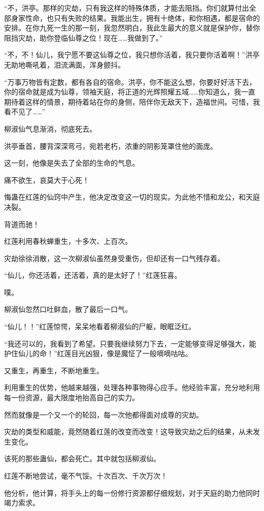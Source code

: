 \begin{this_body}
“不，洪亭。那样的灾劫，只有我这样的特殊体质，才能去阻挡。你们就算付出全部身家性命，也只有失败的结果。我能出生，拥有十绝体，和你相遇，都是宿命的安排。在你九死一生的那一刻，我忽然明白，我此生最大的意义就是保护你，替你阻挡灾劫，助你登临仙尊之位！现在……我做到了。”

“不，不！仙儿，我宁愿不要这仙尊之位，我只想你活着，我只要你活着啊！”洪亭无助地嘶吼着，泪流满面，浑身颤抖。

“万事万物皆有定数，都有各自的宿命。洪亭，你不能这么想，你要好好活下去，你的宿命就是成为仙尊，领袖天庭，将正道的光辉照耀五域……你知道么，我一直期待着这样的情景，期待着站在你的身侧，陪伴你无敌天下，造福世间。可惜，我看不见了……”

柳淑仙气息渐消，彻底死去。

洪亭垂首，腰背深深弯弓，宛若老朽，浓重的阴影笼罩住他的面庞。

这一刻，他像是失去了全部的生命的气息。

痛不欲生，哀莫大于心死！

悔蛊在红莲的仙窍中产生，他决定改变这一切的现实。为此他不惜和龙公，和天庭决裂。

背道而驰！

红莲利用春秋蝉重生，十多次、上百次。

灾劫徐徐消散，这一次柳淑仙虽然身受重伤，但却还有一口气残存着。

“仙儿，你还活着，还活着，真的是太好了！”红莲狂喜。

噗。

柳淑仙忽然口吐鲜血，散了最后一口气。

“仙儿！！”红莲惊愕，呆呆地看着柳淑仙的尸躯，眼眶泛红。

“我还可以的，我看到了希望。只要我继续努力下去，一定能够变得足够强大，能护住仙儿的命！”红莲目光凶狠，像是魔怔了一般嘀嘀咕咕。

又重生，再重生，不断地重生。

利用重生的优势，他越来越强，处理各种事物得心应手。他经验丰富，充分地利用每一份资源，最大限度地抬高自己的实力。

然而就像是一个又一个的轮回，每一次他都得面对成尊的灾劫。

灾劫的类型和威能，竟然随着红莲的改变而改变！这导致灾劫之后的结果，从未发生变化。

该死的那些蛊仙，都会死亡。其中就包括柳淑仙。

红莲不断地尝试，毫不气馁。十次百次、千次万次！

他分析，他计算，将手头上的每一份修行资源都仔细规划，对于天庭的助力他同时竭力索求。


\end{this_body}
